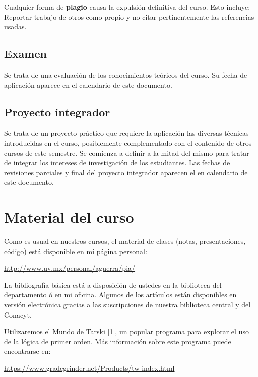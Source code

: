 \documentclass[10pt]{article}
\begin{document}
Cualquier forma de \textbf{plagio} causa la expulsión definitiva del
curso. Esto incluye: Reportar trabajo de otros como propio y no citar
pertinentemente las referencias usadas.

\subsection{Examen}

Se trata de una evaluación de los conocimientos teóricos del curso. Su
fecha de aplicación aparece en el calendario de este documento.

\subsection{Proyecto integrador}

Se trata de un proyecto práctico que requiere la aplicación las
diversas técnicas introducidas en el curso, posiblemente complementado
con el contenido de otros cursos de este semestre. Se comienza a
definir a la mitad del mismo para tratar de integrar los intereses de
investigación de los estudiantes. Las fechas de revisiones parciales y
final del proyecto integrador aparecen el en calendario de este
documento.

\section{Material del curso}

Como es usual en nuestros cursos, el material de clases (notas,
presentaciones, código) está disponible en mi página personal:

\begin{center}
  \url{http://www.uv.mx/personal/aguerra/pia/}
\end{center}

La bibliografía básica está a disposición de ustedes en la biblioteca
del departamento ó en mi oficina. Algunos de los artículos están
disponibles en versión electrónica gracias a las suscripciones de
nuestra biblioteca central y del Conacyt.

Utilizaremos el Mundo de Tarski [1], un popular programa para explorar
el uso de la lógica de primer orden. Más información
sobre este programa puede encontrarse en:

\begin{center}
  \url{https://www.gradegrinder.net/Products/tw-index.html}
\end{center}
\end{document}
